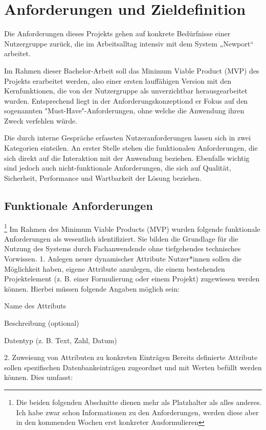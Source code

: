 \section{Anforderungen und Zieldefinition}
Die Anforderungen dieses Projekts gehen auf konkrete Bedürfnisse einer Nutzergruppe zurück, 
die im Arbeitsalltag intensiv mit dem System „Newport“ arbeitet. 

Im Rahmen dieser Bachelor-Arbeit soll das Minimum Viable Product (MVP) des Projekts erarbeitet werden, also 
einer ersten lauffähigen Version mit den Kernfunktionen, die von der Nutzergruppe als unverzichtbar herausgearbeitet 
wurden. Entsprechend liegt in der Anforderungskonzeptiond er Fokus auf den sogenannten "Must-Have"-Anforderungen,
ohne welche die Anwendung ihren Zweck verfehlen würde. 

Die durch interne Gespräche erfassten Nutzeranforderungen lassen sich in zwei Kategorien einteilen. An erster Stelle stehen
die funktionalen Anforderungen, die sich direkt auf die Interaktion mit der Anwendung beziehen. Ebenfalls wichtig sind jedoch auch
nicht-funktionale Anforderungen, die sich auf Qualität, Sicherheit, Performance und Wartbarkeit der Lösung beziehen.
\subsection{Funktionale Anforderungen}
\footnote{Die beiden folgenden Abschnitte dienen mehr als Platzhalter als alles anderes. Ich habe zwar schon Informationen zu den Anforderungen, werden
diese aber in den kommenden Wochen erst konkreter Ausformulieren}
Im Rahmen des Minimum Viable Products (MVP) wurden folgende funktionale Anforderungen als wesentlich identifiziert. 
Sie bilden die Grundlage für die Nutzung des Systems durch Fachanwendende ohne tiefgehendes technisches Vorwissen.
\large{1. Anlegen neuer dynamischer Attribute}\break
Nutzer*innen sollen die Möglichkeit haben, eigene Attribute anzulegen, die einem bestehenden Projektelement 
(z. B. einer Formulierung oder einem Projekt) zugewiesen werden können. Hierbei müssen folgende Angaben möglich sein:

Name des Attributs

Beschreibung (optional)

Datentyp (z. B. Text, Zahl, Datum)

\large{2. Zuweisung von Attributen zu konkreten Einträgen}\break
Bereits definierte Attribute sollen spezifischen Datenbankeinträgen zugeordnet und mit Werten befüllt werden können. Dies umfasst:

